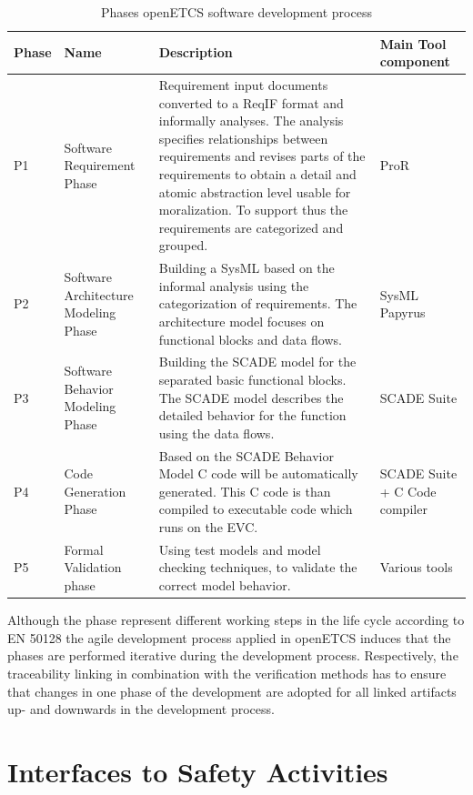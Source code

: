 \documentclass{template/openetcs_report}
\begin{document}
\begin{table}[htbp]
  \centering
  
  \caption{Phases openETCS software development process}
\begin{tabular}{|p{1cm}|p{2cm}|p{7.5cm}|p{2.5cm}|}
\hline \textbf{Phase} & \textbf{Name} & \textbf{Description} & \textbf{Main Tool component} \\ 
\hline P1 & Software Requirement Phase & Requirement input documents converted to a ReqIF format and informally analyses. The analysis specifies relationships between requirements and revises parts of the requirements to obtain a detail and atomic abstraction level usable for moralization. To support thus the requirements are categorized and grouped. & ProR \\ 
\hline P2 & Software Architecture Modeling Phase & Building a SysML based on the informal analysis using the categorization of requirements. The architecture model focuses on functional blocks and data flows. & SysML Papyrus \\ 
\hline P3 & Software Behavior Modeling Phase & Building the SCADE model for the separated basic functional blocks. The SCADE model describes the detailed behavior for the function using the data flows. & SCADE Suite \\ 
\hline P4 & Code Generation Phase & Based on the SCADE Behavior Model C code will be automatically generated. This C code is than compiled to executable code which runs on the EVC. & SCADE Suite + C Code compiler\\
\hline P5 & Formal Validation phase & Using test models and model checking techniques, to validate the correct model behavior.  & Various tools \\ 
\hline 
\end{tabular} 
\label{tab:DevelopmentPhases}
\end{table}

Although the phase represent different working steps in the life cycle according to EN 50128 the agile development process applied in openETCS induces that the phases are performed iterative during the development process. Respectively, the traceability linking in combination with the verification methods has to ensure that changes in one phase of the development are adopted for all linked artifacts up- and downwards in the development process.

\section{Interfaces to Safety Activities}
\end{document}
